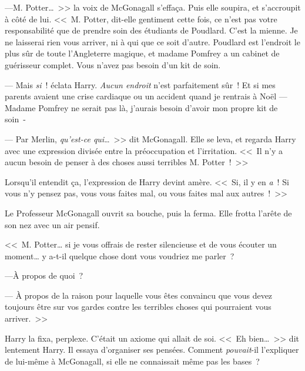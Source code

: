 ---M. Potter…~>> la voix de McGonagall s'effaça. Puis elle soupira, et s'accroupit à côté de lui. <<~M. Potter, dit-elle gentiment cette fois, ce n'est pas votre responsabilité que de prendre soin des étudiants de Poudlard. C'est la mienne. Je ne laisserai rien vous arriver, ni à qui que ce soit d'autre. Poudlard est l'endroit le plus sûr de toute l'Angleterre magique, et madame Pomfrey a un cabinet de guérisseur complet. Vous n'avez pas besoin d'un kit de soin.

--- Mais \emph{si}~! éclata Harry. \emph{Aucun endroit} n'est parfaitement sûr~! Et si mes parents avaient une crise cardiaque ou un accident quand je rentrais à Noël — Madame Pomfrey ne serait pas là, j'aurais besoin d'avoir mon propre kit de soin~-

--- Par Merlin, \emph{qu'est-ce qui}…~>> dit McGonagall. Elle se leva, et regarda Harry avec une expression divisée entre la préoccupation et l'irritation. <<~Il n'y a aucun besoin de penser à des choses aussi terribles M. Potter~!~>>

Lorsqu'il entendit ça, l'expression de Harry devint amère. <<~Si, il y en \emph{a}~! Si vous n'y pensez pas, vous vous faites mal, ou vous faites mal aux autres~!~>>

Le Professeur McGonagall ouvrit sa bouche, puis la ferma. Elle frotta l'arête de son nez avec un air pensif. 

<<~M. Potter… si je vous offrais de rester silencieuse et de vous écouter un moment… y a-t-il quelque chose dont vous voudriez me parler~?

---À propos de quoi~?

--- À propos de la raison pour laquelle vous êtes convaincu que vous devez toujours être sur vos gardes contre les terribles choses qui pourraient vous arriver.~>>

Harry la fixa, perplexe. C'était un axiome qui allait de soi. <<~Eh bien…~>> dit lentement Harry. Il essaya d'organiser ses pensées. Comment \emph{pouvait}-il l'expliquer de lui-même à McGonagall, si elle ne connaissait même pas les bases~?

